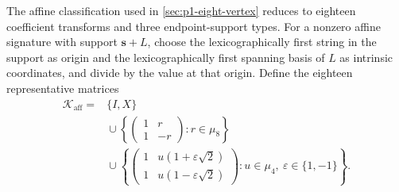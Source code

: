\documentclass[11pt,letterpaper,onecolumn]{article}
\theoremstyle{plain}
\theoremstyle{definition}
\theoremstyle{remark}
\begin{document}
The affine classification used in \cref{sec:p1-eight-vertex} reduces to
eighteen coefficient transforms and three endpoint-support types.  For a nonzero affine signature with support \({\mathbf{s}}+L\),
choose the lexicographically first string in the support as origin and the
lexicographically first spanning basis of \(L\) as intrinsic coordinates,
and divide by the value at that origin.  Define the eighteen representative matrices
\begin{equation}
\begin{split}
\mathscr K_{\mathrm{aff}}
={}&\{I,X\}\\
&{}\cup
\left\{
 \begin{pmatrix}1&r\\1&-r\end{pmatrix}:r\in\mu_8
\right\}\\
&{}\cup
\left\{
 \begin{pmatrix}
 1&u(1+\varepsilon\sqrt2)\\
 1&u(1-\varepsilon\sqrt2)
 \end{pmatrix}:
 u\in\mu_4,\ \varepsilon\in\{1,-1\}
\right\}.
\end{split}
\label{eq:cert-affine-q4-cores}
\end{equation}
\end{document}
